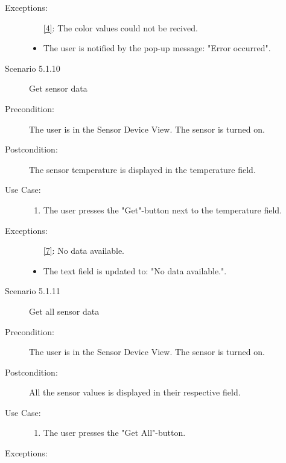 \documentclass[a4paper]{article}
\begin{document}
\begin{description}
\item[Exceptions:]
\item[]

\begin{itemize}
\item [\ref{4}:] The color values could not be recived.
\item The user is notified by the pop-up message: "Error occurred".
\end{itemize}

\item[]

\item[Scenario 5.1.10] Get sensor data
\item[Precondition:] The user is in the Sensor Device View. The sensor is turned on.
\item[Postcondition:] The sensor temperature is displayed in the temperature field.
\item[Use Case:]\mbox{}
\begin{enumerate}
\item \label{7} The user presses the "Get"-button next to the temperature field.

\end{enumerate}

\item[Exceptions:]
\item[]

\begin{itemize}
\item [\ref{7}:] No data available.
\item The text field is updated to: "No data available.".
\end{itemize}

\item[]

\item[Scenario 5.1.11] Get all sensor data
\item[Precondition:] The user is in the Sensor Device View. The sensor is turned on.
\item[Postcondition:] All the sensor values is displayed in their respective field.
\item[Use Case:]\mbox{}
\begin{enumerate}
\item \label{7} The user presses the "Get All"-button.

\end{enumerate}

\item[Exceptions:]
\item[]


\end{description}
\end{document}
